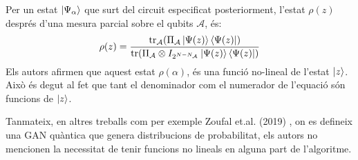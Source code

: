Per un estat $\ket{\Psi_\alpha}$ que surt del circuit especificat posteriorment, l'estat $\rho(z)$ després d'una mesura parcial sobre el qubits $\mathcal{A}$, és:
$$
\rho(z) = \frac{\tr_\mathcal{A}(\Pi_\mathcal{A}\ket{\Psi(z)}\bra{\Psi(z)})}{\tr(\Pi_\mathcal{A} \otimes I_{2^{N-N_\mathcal{A}}}\ket{\Psi(z)}\bra{\Psi(z)})}
$$
Els autors afirmen que aquest estat $\rho(\alpha)$, és una funció no-lineal de l'estat $\ket{z}$. Això és degut al fet que tant el denominador com el numerador de l'equació són funcions de $\ket{z}$.

Tanmateix, en altres treballs com per exemple Zoufal et.al. (2019) \cite{QGAN_IBM}, on es defineix una GAN quàntica que genera distribucions de probabilitat, els autors no mencionen la necessitat de tenir funcions no lineals en alguna part de l'algoritme.


